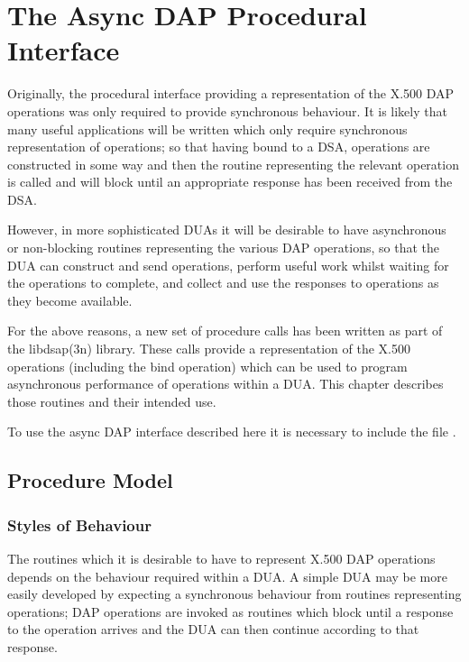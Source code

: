 
\chapter {The Async DAP Procedural Interface}

Originally, the procedural interface providing a representation of
the X.500 DAP operations was only required to provide synchronous
behaviour.
It is likely that many useful applications will be written which only
require synchronous representation of operations; so that having
bound to a DSA, operations are constructed in some way and then
the routine representing the relevant operation is called and will
block until an appropriate response has been received from the DSA.

However, in more sophisticated DUAs it will be desirable to have
asyn\-chron\-ous or non-blocking routines representing the various
DAP operations, so that the DUA can construct and send operations,
perform useful work whilst waiting for the operations to complete,
and collect and use the responses to operations as they become
available.

For the above reasons, a new set of procedure calls has been written
as part of the \man libdsap(3n) library. These calls provide a representation
of the X.500 operations (including the bind operation) which can be
used to program asynchronous performance of operations within a DUA.
This chapter describes those routines and their intended use.

To use the async DAP interface described here it is necessary to include
the file .

\section {Procedure Model}

\subsection {Styles of Behaviour}

The routines which it is desirable to have to represent X.500 DAP
operations depends on the behaviour required within a DUA.
A simple DUA may be more easily developed by expecting a synchronous
behaviour from routines representing operations; DAP operations
are invoked as routines which block until a response to the
operation arrives and the DUA can then continue according to
that response.


